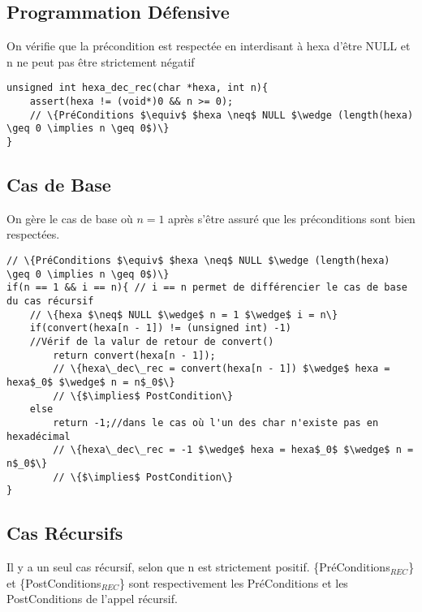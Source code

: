 \documentclass[a4paper, 11pt, oneside]{article}
\begin{document}
\subsection{Programmation Défensive}
On vérifie que la précondition est respectée en interdisant à hexa d'être NULL et n ne peut pas être strictement négatif

\begin{lstlisting}
unsigned int hexa_dec_rec(char *hexa, int n){
    assert(hexa != (void*)0 && n >= 0);
    // \{PréConditions $\equiv$ $hexa \neq$ NULL $\wedge (length(hexa) \geq 0 \implies n \geq 0$)\}
}
\end{lstlisting}

\newpage

\subsection{Cas de Base}
On gère le cas de base où $n = 1$ après s'être assuré que les préconditions sont bien respectées.

\begin{lstlisting}
// \{PréConditions $\equiv$ $hexa \neq$ NULL $\wedge (length(hexa) \geq 0 \implies n \geq 0$)\}
if(n == 1 && i == n){ // i == n permet de différencier le cas de base du cas récursif
    // \{hexa $\neq$ NULL $\wedge$ n = 1 $\wedge$ i = n\}
    if(convert(hexa[n - 1]) != (unsigned int) -1)
    //Vérif de la valur de retour de convert()
        return convert(hexa[n - 1]);
        // \{hexa\_dec\_rec = convert(hexa[n - 1]) $\wedge$ hexa = hexa$_0$ $\wedge$ n = n$_0$\}
        // \{$\implies$ PostCondition\}
    else
        return -1;//dans le cas où l'un des char n'existe pas en hexadécimal
        // \{hexa\_dec\_rec = -1 $\wedge$ hexa = hexa$_0$ $\wedge$ n = n$_0$\}
        // \{$\implies$ PostCondition\}
}
\end{lstlisting}

\subsection{Cas Récursifs}
Il y a un seul cas récursif, selon que n est strictement positif.
\{PréConditions$_{REC}$\} et \{PostConditions$_{REC}$\} sont respectivement les PréConditions et les PostConditions de l'appel récursif.
\end{document}
